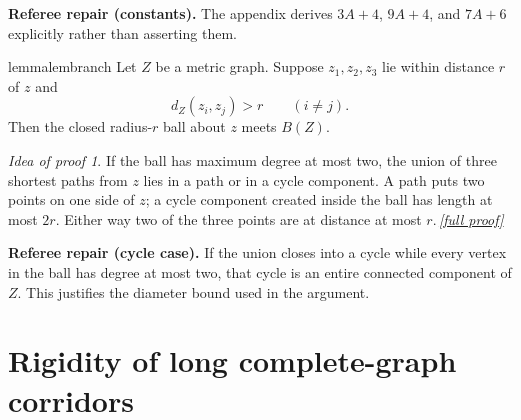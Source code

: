 \documentclass[11pt,a4paper]{article}
\theoremstyle{plain}
\theoremstyle{definition}
\theoremstyle{remark}
\newtheorem*{proofidea}{Idea of proof}
\newcommand{\fullproofref}[1]{\,\hyperref[#1]{\textit{[full proof]}}}
\begin{document}
\begin{repairbox}
\textbf{Referee repair (constants).} The appendix derives $3A+4$, $9A+4$, and $7A+6$ explicitly rather than asserting them.
\end{repairbox}

\begin{restatable}{lemma}{lembranch}\label{lem:branch}
Let $Z$ be a metric graph. Suppose $z_1,z_2,z_3$ lie within distance $r$ of $z$ and
\[
 d_Z(z_i,z_j)>r\qquad(i\ne j).
\]
Then the closed radius-$r$ ball about $z$ meets $B(Z)$.
\end{restatable}
\begin{proofidea}
If the ball has maximum degree at most two, the union of three shortest paths from $z$ lies in a path or in a cycle component. A path puts two points on one side of $z$; a cycle component created inside the ball has length at most $2r$. Either way two of the three points are at distance at most $r$.\fullproofref{pf:branch}
\end{proofidea}

\begin{repairbox}
\textbf{Referee repair (cycle case).} If the union closes into a cycle while every vertex in the ball has degree at most two, that cycle is an entire connected component of $Z$. This justifies the diameter bound used in the argument.
\end{repairbox}

\section{Rigidity of long complete-graph corridors}\label{sec:rigidity}
\end{document}
